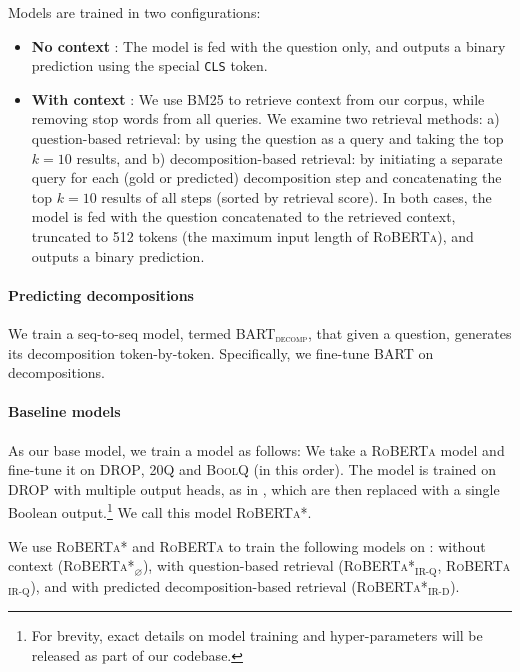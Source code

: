 {Models are trained in two configurations:
\begin{itemize}[leftmargin=*,topsep=0pt,itemsep=0pt,parsep=0pt]
    \item \textbf{No context} 
    : The model is fed with the question only, and outputs a binary prediction using the special \texttt{CLS} token.

    \item \textbf{With context} 
    : We use \textsc{BM25} \cite{robertson1995okapi} to retrieve context from our corpus, while removing stop words from all queries. We examine two retrieval methods: a) question-based retrieval: by using the question as a query and taking the top $k=10$ results, and b) decomposition-based retrieval: by initiating a separate query for each (gold or predicted) decomposition step and concatenating the top $k=10$ results of all steps (sorted by retrieval score).
    In both cases, the model is fed with the question concatenated to the retrieved context, truncated to
    512 tokens (the maximum input length of \textsc{RoBERTa}), and outputs a binary prediction.
\end{itemize}

\paragraph{Predicting decompositions}
We train a seq-to-seq model, termed  \textsc{BART$_{\text{decomp}}$}, that given a question, generates its decomposition token-by-token. Specifically, we fine-tune \textsc{BART} \cite{lewis2020bart} on \strategyqa{} decompositions.

\paragraph{Baseline models}
As our base model, we train a model as follows: 
We take a \textsc{RoBERTa} \cite{liu2019roberta} model and fine-tune it on \textsc{DROP}, \textsc{20Q} and \textsc{BoolQ} (in this order). The model is trained on \textsc{DROP} with multiple output heads, as in \citet{segal2020simple}, which are then replaced with a single Boolean output.\footnote{For brevity, exact details on model training and hyper-parameters will be released as part of our codebase.} We call this model \textsc{RoBERTa*}.

We use \textsc{RoBERTa*} and \textsc{RoBERTa} to train the following models on \strategyqa{}: without context (\textsc{RoBERTa*$_\varnothing$}), with question-based retrieval (\textsc{RoBERTa*$_\text{IR-Q}$}, \textsc{RoBERTa$_\text{IR-Q}$}), and with predicted decomposition-based retrieval (\textsc{RoBERTa*$_\text{IR-D}$}). 

}
